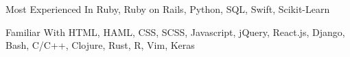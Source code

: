 


\begin{cvskills}


  \cvskill
  {Most Experienced In}
  {Ruby, Ruby on Rails, Python, SQL, Swift, Scikit-Learn}


  \cvskill
  {Familiar With}
  {HTML, HAML, CSS, SCSS, Javascript, jQuery, React.js, Django, Bash, C/C++, Clojure, Rust, R, Vim, Keras}




\end{cvskills}
